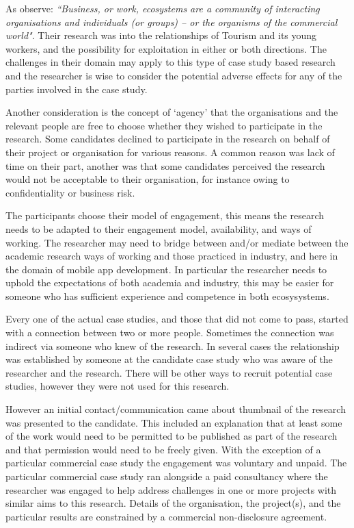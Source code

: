 As \citet[p.2]{robinson2019_applying_endosymbiosis_theory_tourism_and_its_young_workers} observe: \emph{``Business, or work, ecosystems are a community of interacting organisations and individuals (or groups) – or the organisms of the commercial world"}. Their research was into the relationships of Tourism and its young workers, and the possibility for exploitation in either or both directions. The challenges in their domain may apply to this type of case study based research and the researcher is wise to consider the potential adverse effects for any of the parties involved in the case study.

Another consideration is the concept of `agency' that the organisations and the relevant people are free to choose whether they wished to participate in the research. Some candidates declined to participate in the research on behalf of their project or organisation for various reasons. A common reason was lack of time on their part, another was that some candidates perceived the research would not be acceptable to their organisation, for instance owing to confidentiality or business risk.

The participants choose their model of engagement, this means the research needs to be adapted to their engagement model, availability, and ways of working. The researcher may need to bridge between and/or mediate between the academic research ways of working and those practiced in industry, and here in the domain of mobile app development. In particular the researcher needs to uphold the expectations of both academia and industry, this may be easier for someone who has sufficient experience and competence in both ecosysystems.

Every one of the actual case studies, and those that did not come to pass, started with a connection between two or more people. Sometimes the connection was indirect via someone who knew of the research. In several cases the relationship was established by someone at the candidate case study who was aware of the researcher and the research. There will be other ways to recruit potential case studies, however they were not used for this research.

However an initial contact/communication came about thumbnail of the research was presented to the candidate. This included an explanation that at least some of the work would need to be permitted to be published as part of the research and that permission would need to be freely given. With the exception of a particular commercial case study the engagement was voluntary and unpaid. The particular commercial case study ran alongside a paid consultancy where the researcher was engaged to help address challenges in one or more projects with similar aims to this research. Details of the organisation, the project(s), and the particular results are constrained by a commercial non-disclosure agreement.


